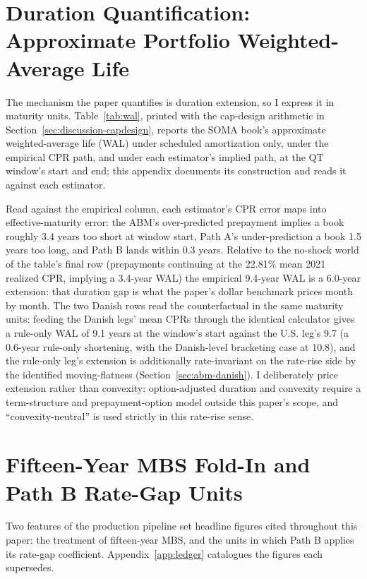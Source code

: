 \documentclass[12pt]{article}
\begin{document}
\section{Duration Quantification: Approximate Portfolio Weighted-Average Life}\label{sec:robustness-wal}

The mechanism the paper quantifies is duration extension, so I express it in maturity units. Table~\ref{tab:wal}, printed with the cap-design arithmetic in Section~\ref{sec:discussion-capdesign}, reports the SOMA book's approximate weighted-average life (WAL) under scheduled amortization only, under the empirical CPR path, and under each estimator's implied path, at the QT window's start and end; this appendix documents its construction and reads it against each estimator.

Read against the empirical column, each estimator's CPR error maps into effective-maturity error: the ABM's over-predicted prepayment implies a book roughly 3.4 years too short at window start, Path A's under-prediction a book 1.5 years too long, and Path B lands within 0.3 years. Relative to the no-shock world of the table's final row (prepayments continuing at the 22.81\% mean 2021 realized CPR, implying a 3.4-year WAL) the empirical 9.4-year WAL is a 6.0-year extension: that duration gap is what the paper's dollar benchmark prices month by month. The two Danish rows read the counterfactual in the same maturity units: feeding the Danish legs' mean CPRs through the identical calculator gives a rule-only WAL of 9.1 years at the window's start against the U.S. leg's 9.7 (a 0.6-year rule-only shortening, with the Danish-level bracketing case at 10.8), and the rule-only leg's extension is additionally rate-invariant on the rate-rise side by the identified moving-flatness (Section~\ref{sec:abm-danish}). I deliberately price extension rather than convexity: option-adjusted duration and convexity require a term-structure and prepayment-option model outside this paper's scope, and ``convexity-neutral'' is used strictly in this rate-rise sense.

\section{Fifteen-Year MBS Fold-In and Path B Rate-Gap Units}\label{sec:robustness-pipeline}

Two features of the production pipeline set headline figures cited throughout this paper: the treatment of fifteen-year MBS, and the units in which Path B applies its rate-gap coefficient. Appendix~\ref{app:ledger} catalogues the figures each supersedes.
\end{document}
